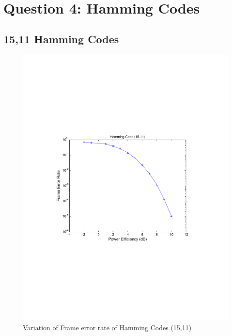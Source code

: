 \documentclass[11pt, english]{article}
\begin{document}
\section{Question 4: Hamming Codes}
\subsection{15,11 Hamming Codes}
\begin{figure}[H]
    \centering
    \includegraphics[width=.8\textwidth]{hamming_5_11_incomplete_run_fer.pdf}
    \caption{Variation of Frame error rate of Hamming Codes (15,11)}
    \label{ham_15_11_fer}
\end{figure}
\end{document}
